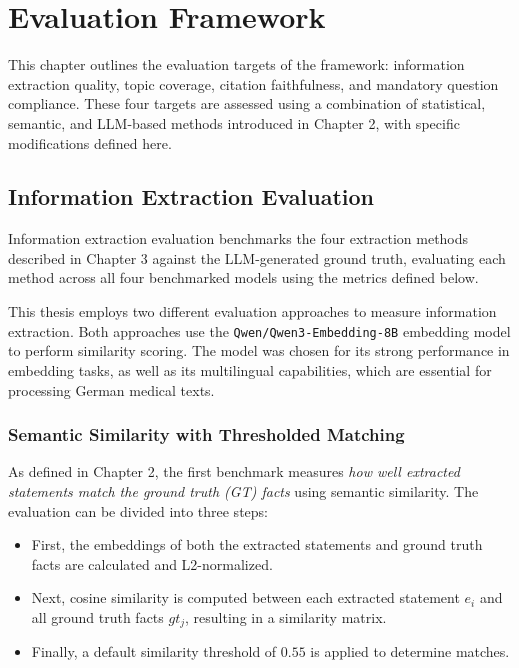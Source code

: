 \chapter{Evaluation Framework}

This chapter outlines the evaluation targets of the framework: information extraction quality, topic coverage, citation faithfulness, and mandatory question compliance. 
These four targets are assessed using a combination of statistical, semantic, and LLM-based methods introduced in Chapter 2, with specific modifications defined here.

\section{Information Extraction Evaluation}

Information extraction evaluation benchmarks the four extraction methods described in Chapter 3 against the LLM-generated ground truth, evaluating each method across all four benchmarked models using the metrics defined below.

This thesis employs two different evaluation approaches to measure information extraction. 
Both approaches use the \texttt{Qwen/Qwen3-Embedding-8B} embedding model to perform similarity scoring.
The model was chosen for its strong performance in embedding tasks, as well as its multilingual capabilities, which are essential for processing German medical texts.

\subsection{Semantic Similarity with Thresholded Matching}

As defined in Chapter 2, the first benchmark measures \textit{how well extracted statements match the ground truth (GT) facts} using semantic similarity.
The evaluation can be divided into three steps:
\begin{itemize}
    \item First, the embeddings of both the extracted statements and ground truth facts are calculated and L2-normalized.
    \item Next, cosine similarity is computed between each extracted statement $e_i$ and all ground truth facts $gt_j$, resulting in a similarity matrix.
    \item Finally, a default similarity threshold of $0.55$ is applied to determine matches.
\end{itemize} 

